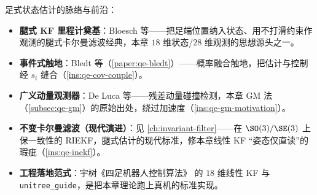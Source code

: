\noindent 足式状态估计的脉络与前沿：
\begin{itemize}
  \item \textbf{腿式 KF 里程计奠基}：Bloesch 等\cite{bloesch2013state}——把足端位置纳入状态、用不打滑约束作观测的腿式卡尔曼滤波经典，本章 $18$ 维状态/$28$ 维观测的思想源头之一。
  \item \textbf{事件式触地}：Bledt 等\cite{bledt2018contact}（\cref{paper:qe-bledt}）——概率融合触地，把估计与控制经 $s_i$ 缝合（\cref{ins:qe-cov-couple}）。
  \item \textbf{广义动量观测器}：De Luca 等\cite{deluca2006collision}——残差动量碰撞检测，本章 GM 法（\cref{subsec:qe-gm}）的原始出处，绕过加速度（\cref{ins:qe-gm-motivation}）。
  \item \textbf{不变卡尔曼滤波（现代演进）}：见 \cref{ch:invariant-filter}——在 $\SO(3)/\SE(3)$ 上保一致性的 RIEKF，腿式估计的现代标准，修本章线性 KF “姿态仅直读”的瑕疵（\cref{ins:qe-inekf}）。
  \item \textbf{工程落地范式}：宇树《四足机器人控制算法》\cite{unitree2023quadruped} 的 $18$ 维线性 KF 与 \texttt{unitree\_guide}，是把本章理论跑上真机的标准实现。
\end{itemize}

